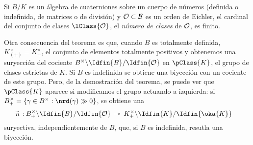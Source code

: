 \begin{coroFinClassNum}
	Si $B/K$ es un \'{a}lgebra de cuaterniones sobre un cuerpo de
	n\'{u}meros (definida o indefinida, de matrices o de divisi\'{o}n)
	y $\cal{O}\subset B$ es un orden de Eichler, el cardinal del conjunto
	de clases $\lClass{\cal{O}}$, el \emph{n\'{u}mero de clases}
	de $\cal{O}$, es finito.
\end{coroFinClassNum}

Otra consecuencia del teorema es que, cuando $B$ es totalmente definida,
$K_{(+)}^{\times}=K_{+}^{\times}$, el conjunto de elementos totalmente
positivos y obtenemos una suryecci\'{o}n del cociente
$B^{\times}\backslash\Idfin{B}/\Idfin{\cal{O}}$ en $\pClass{K}$,
el grupo de clases estrictas de $K$. Si $B$ es indefinida se obtiene
una biyecci\'{o}n con un cociente de este grupo. Pero, de la demostraci\'{o}n
del teorema, se puede ver que $\pClass{K}$ aparece si modificamos el grupo
actuando a izquierda: si
$B_{+}^{\times}=\{\gamma\in B^{\times}:\nrd(\gamma)\gg 0\}$,
se obtiene una
\begin{align*}
	\widetilde{n}\,:\, &
	B_{+}^{\times}\backslash\Idfin{B}/\Idfin{\cal{O}}
	\,\twoheadrightarrow\,
	K_{+}^{\times}\backslash\Idfin{K}/\Idfin{\oka{K}}
\end{align*}
%
suryectiva, independientemente de $B$, que, si $B$ es indefinida, resutla
una biyecci\'{o}n.

